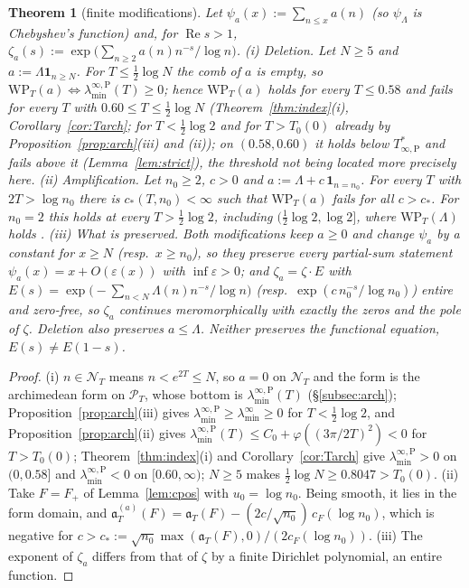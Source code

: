 \documentclass[11pt]{amsart}
\newtheorem{theorem}{Theorem}[section]
\theoremstyle{definition}
\theoremstyle{remark}
\newcommand{\Rel}{\operatorname{Re}}
\newcommand{\PT}{\mathcal P_T}
\newcommand{\cF}{c_F}
\newcommand{\NT}{\mathcal N_T}
\newcommand{\laminf}{\lambda^{\infty}_{\min}}
\newcommand{\laminfP}{\lambda^{\infty,\mathrm P}_{\min}}
\begin{document}
\begin{theorem}[finite modifications]\label{thm:finmod}
Let $\psi_a(x):=\sum_{n\le x}a(n)$ (so $\psi_\Lambda$ is Chebyshev's function) and, for $\Rel s>1$,
$\zeta_a(s):=\exp\big(\sum_{n\ge2}a(n)n^{-s}/\log n\big)$.
\emph{(i) Deletion.} Let $N\ge5$ and $a:=\Lambda\mathbf 1_{n\ge N}$. For $T\le\frac12\log N$ the comb of $a$ is
empty, so $\mathrm{WP}_T(a)\iff\laminfP(T)\ge0$; hence $\mathrm{WP}_T(a)$ holds for every $T\le0.58$
and fails for every $T$ with $0.60\le T\le\frac12\log N$ (Theorem~\ref{thm:index}(i), Corollary~\ref{cor:Tarch}; for $T<\frac12\log2$
and for $T>T_0(0)$ already by Proposition~\ref{prop:arch}(iii) and (ii)); on $(0.58,0.60)$ it holds below
$T^*_{\infty,\mathrm P}$ and fails above it (Lemma~\ref{lem:strict}), the threshold not being located more
precisely here.
\emph{(ii) Amplification.} Let $n_0\ge2$, $c>0$ and $a:=\Lambda+c\,\mathbf 1_{n=n_0}$. For every $T$ with
$2T>\log n_0$ there is $c_*(T,n_0)<\infty$ such that $\mathrm{WP}_T(a)$ fails for all $c>c_*$. For $n_0=2$
this holds at every $T>\frac12\log2$, including $(\frac12\log2,\log2]$, where $\mathrm{WP}_T(\Lambda)$ holds
\cite{Paper42}.
\emph{(iii) What is preserved.} Both modifications keep $a\ge0$ and change $\psi_a$ by a constant for
$x\ge N$ (resp.\ $x\ge n_0$), so they preserve every partial-sum statement $\psi_a(x)=x+O(\varepsilon(x))$
with $\inf\varepsilon>0$; and $\zeta_a=\zeta\cdot E$ with
$E(s)=\exp\big(-\sum_{n<N}\Lambda(n)n^{-s}/\log n\big)$ (resp.\ $\exp(c\,n_0^{-s}/\log n_0)$) entire and zero-free,
so $\zeta_a$ continues meromorphically with \emph{exactly the zeros and the pole of $\zeta$}. Deletion also
preserves $a\le\Lambda$. Neither preserves the functional equation, $E(s)\ne E(1-s)$.
\end{theorem}
\begin{proof}
(i) $n\in\NT$ means $n<e^{2T}\le N$, so $a=0$ on $\NT$ and the form is the archimedean form on $\PT$, whose
bottom is $\laminfP(T)$ (\S\ref{subsec:arch}); Proposition~\ref{prop:arch}(iii) gives
$\laminfP\ge\laminf\ge0$ for $T<\frac12\log2$, and Proposition~\ref{prop:arch}(ii) gives
$\laminfP(T)\le C_0+\varphi((3\pi/2T)^2)<0$ for $T>T_0(0)$; Theorem~\ref{thm:index}(i) and Corollary~\ref{cor:Tarch} give $\laminfP>0$ on
$(0,0.58]$ and $\laminfP<0$ on $[0.60,\infty)$; $N\ge5$ makes $\frac12\log N\ge0.8047>T_0(0)$.
(ii) Take $F=F_+$ of Lemma~\ref{lem:cpos} with $u_0=\log n_0$. Being smooth, it lies in the form domain,
and $\mathfrak a^{(a)}_T(F)=\mathfrak a_T(F)-(2c/\sqrt{n_0})\,\cF(\log n_0)$, which is negative for
$c>c_*:=\sqrt{n_0}\max(\mathfrak a_T(F),0)/(2\cF(\log n_0))$. (iii) The exponent of $\zeta_a$ differs from that
of $\zeta$ by a finite Dirichlet polynomial, an entire function.
\end{proof}
\end{document}
